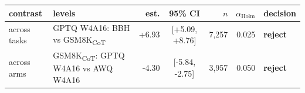 \begin{tabular}{llrcrrl}
\toprule
contrast & levels & est. & 95\% CI & $n$ & $\alpha_{\text{Holm}}$ & decision \\
\midrule
across tasks & GPTQ W4A16: BBH vs GSM8K\textsubscript{CoT} & +6.93 & [+5.09, +8.76] & 7,257 & 0.025 & \textbf{reject} \\
across arms & GSM8K\textsubscript{CoT}: GPTQ W4A16 vs AWQ W4A16 & -4.30 & [-5.84, -2.75] & 3,957 & 0.050 & \textbf{reject} \\
\bottomrule
\end{tabular}

